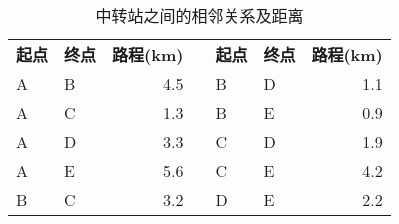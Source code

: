 \documentclass[withoutpreface]{cumcmthesis}
\begin{document}
\begin{table}[H]
  \centering
  \caption{中转站之间的相邻关系及距离}
  \begin{tabular}{|llr|r|llr|}
    \cline{1-3}\cline{5-7}    \rowcolor[rgb]{ .267,  .447,  .769} \textcolor[rgb]{ 1,  1,  1}{\textbf{起点}} & \textcolor[rgb]{ 1,  1,  1}{\textbf{终点}} & \multicolumn{1}{l|}{\textcolor[rgb]{ 1,  1,  1}{\textbf{路程(km)}}} & \cellcolor[rgb]{ 1,  1,  1} & \textcolor[rgb]{ 1,  1,  1}{\textbf{起点}} & \textcolor[rgb]{ 1,  1,  1}{\textbf{终点}} & \multicolumn{1}{l|}{\textcolor[rgb]{ 1,  1,  1}{\textbf{路程(km)}}} \bigstrut \\
    \cline{1-3}\cline{5-7}    A                                                                            & B                                        & 4.5                                                               &                             & B                                        & D                                        & 1.1 \bigstrut                                                               \\
    \cline{1-3}\cline{5-7}    A                                                                            & C                                        & 1.3                                                               &                             & B                                        & E                                        & 0.9 \bigstrut                                                               \\
    \cline{1-3}\cline{5-7}    A                                                                            & D                                        & 3.3                                                               &                             & C                                        & D                                        & 1.9 \bigstrut                                                               \\
    \cline{1-3}\cline{5-7}    A                                                                            & E                                        & 5.6                                                               &                             & C                                        & E                                        & 4.2 \bigstrut                                                               \\
    \cline{1-3}\cline{5-7}    B                                                                            & C                                        & 3.2                                                               &                             & D                                        & E                                        & 2.2 \bigstrut                                                               \\
    \cline{1-3}\cline{5-7}\end{tabular}
  \label{Tab:3}
\end{table}
\end{document}
